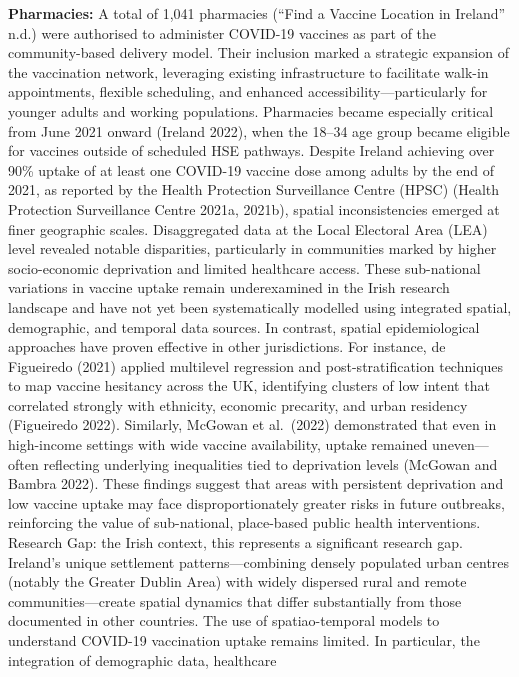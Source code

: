 \documentclass{article}
\begin{document}
\textbf{Pharmacies:} A total of 1,041 pharmacies ({``Find a Vaccine
Location in {Ireland}''} n.d.) were authorised to administer COVID-19
vaccines as part of the community-based delivery model. Their inclusion
marked a strategic expansion of the vaccination network, leveraging
existing infrastructure to facilitate walk-in appointments, flexible
scheduling, and enhanced accessibility---particularly for younger adults
and working populations. Pharmacies became especially critical from June
2021 onward (Ireland 2022), when the 18--34 age group became eligible
for vaccines outside of scheduled HSE pathways. Despite Ireland
achieving over 90\% uptake of at least one COVID-19 vaccine dose among
adults by the end of 2021, as reported by the Health Protection
Surveillance Centre (HPSC) (Health Protection Surveillance Centre 2021a,
2021b), spatial inconsistencies emerged at finer geographic scales.
Disaggregated data at the Local Electoral Area (LEA) level revealed
notable disparities, particularly in communities marked by higher
socio-economic deprivation and limited healthcare access. These
sub-national variations in vaccine uptake remain underexamined in the
Irish research landscape and have not yet been systematically modelled
using integrated spatial, demographic, and temporal data sources. In
contrast, spatial epidemiological approaches have proven effective in
other jurisdictions. For instance, de Figueiredo (2021) applied
multilevel regression and post-stratification techniques to map vaccine
hesitancy across the UK, identifying clusters of low intent that
correlated strongly with ethnicity, economic precarity, and urban
residency (Figueiredo 2022). Similarly, McGowan et al.~(2022)
demonstrated that even in high-income settings with wide vaccine
availability, uptake remained uneven---often reflecting underlying
inequalities tied to deprivation levels (McGowan and Bambra 2022). These
findings suggest that areas with persistent deprivation and low vaccine
uptake may face disproportionately greater risks in future outbreaks,
reinforcing the value of sub-national, place-based public health
interventions. Research Gap: the Irish context, this represents a
significant research gap. Ireland's unique settlement
patterns---combining densely populated urban centres (notably the
Greater Dublin Area) with widely dispersed rural and remote
communities---create spatial dynamics that differ substantially from
those documented in other countries. The use of spatiao-temporal models
to understand COVID-19 vaccination uptake remains limited. In
particular, the integration of demographic data, healthcare
\end{document}
